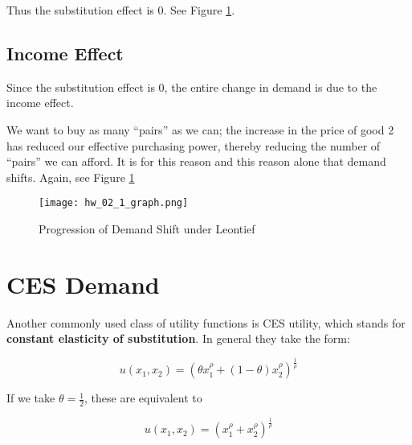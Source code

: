 \documentclass{article}
\begin{document}
Thus the substitution effect is 0. See Figure \ref{leontief}.

\subsection*{Income Effect}

Since the substitution effect is 0, the entire change in demand is due to the income effect.

We want to buy as many ``pairs'' as we can; the increase in the price of good 2 has reduced our effective purchasing power, thereby reducing the number of ``pairs'' we can afford. It is for this reason and this reason alone that demand shifts. Again, see Figure \ref{leontief}

\begin{figure}[htbp]
\centering
\texttt{[image: hw\_02\_1\_graph.png]}
\caption{Progression of Demand Shift under Leontief}
\label{leontief}
\end{figure}

\color{black}

\section{CES Demand}

Another commonly used class of utility functions is CES utility, which stands for \textbf{constant elasticity of substitution}. In general they take the form:

\[ u(x_1, x_2) = \left(\theta x_1^{\rho} + (1-\theta) x_2^{\rho}\right)^{\frac1{\rho}} \]

If we take $\theta = \frac12$, these are equivalent to

\[ u(x_1, x_2) = \left(x_1^{\rho} + x_2^{\rho}\right)^{\frac1{\rho}} \]
\end{document}
